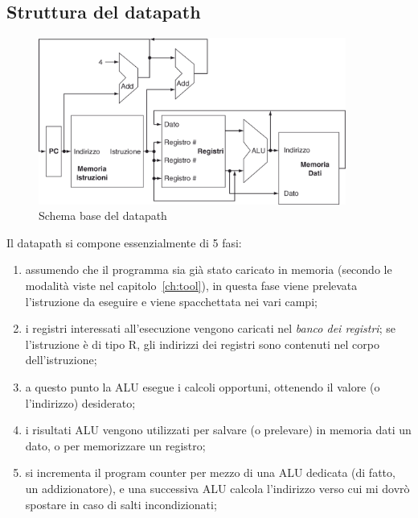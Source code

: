 \documentclass[class=book, crop=false, oneside]{standalone}
\begin{document}
\subsection{Struttura del datapath}
\begin{figure}[H]
	\centering
	\includegraphics[width=0.9\textwidth,keepaspectratio]{datap_1}
	\caption{Schema base del datapath}
\end{figure}
Il datapath si compone essenzialmente di 5 fasi:
\begin{enumerate}
  \item assumendo che il programma sia già stato caricato in memoria (secondo le modalità viste nel capitolo~\ref{ch:tool}), in questa fase viene prelevata l'istruzione da eseguire e viene spacchettata nei vari campi;
  \item i registri interessati all'esecuzione vengono caricati nel \emph{banco dei registri}; se l'istruzione è di tipo R, gli indirizzi dei registri sono contenuti nel corpo dell'istruzione;
  \item a questo punto la ALU esegue i calcoli opportuni, ottenendo il valore (o l’indirizzo) desiderato;
  \item i risultati ALU vengono utilizzati per salvare (o prelevare) in memoria dati un dato, o per memorizzare un registro;
  \item si incrementa il program counter per mezzo di una ALU dedicata (di fatto, un addizionatore), e una successiva ALU calcola l’indirizzo verso cui mi dovrò spostare in caso di salti incondizionati;
\end{enumerate}
\end{document}
